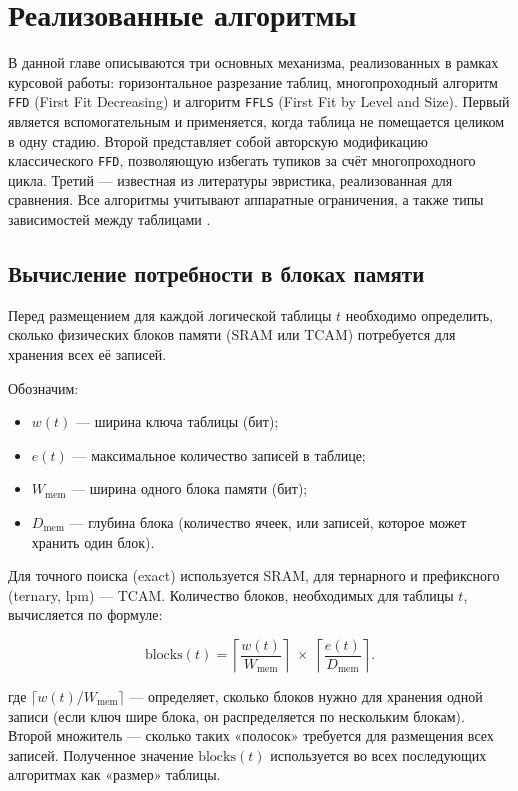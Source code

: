 \section{Реализованные алгоритмы}
\label{sec:Chapter4} 
 

В данной главе описываются три основных механизма, реализованных в рамках курсовой работы: 
горизонтальное разрезание таблиц, многопроходный алгоритм \texttt{FFD} (First Fit Decreasing) и алгоритм 
\texttt{FFLS} (First Fit by Level and Size).  
Первый является вспомогательным и применяется, когда таблица не помещается целиком в одну стадию. 
Второй представляет собой авторскую модификацию классического \texttt{FFD}, позволяющую избегать тупиков 
за счёт многопроходного цикла. Третий — известная из литературы эвристика, 
реализованная для сравнения. Все алгоритмы учитывают аппаратные ограничения, а также типы зависимостей между таблицами .

\subsection{Вычисление потребности в блоках памяти}

Перед размещением для каждой логической таблицы $t$ необходимо определить, сколько физических блоков 
памяти (SRAM или TCAM) потребуется для хранения всех её записей.

Обозначим:
\begin{itemize}
	\item $w(t)$ — ширина ключа таблицы (бит);
	\item $e(t)$ — максимальное количество записей в таблице;
	\item $W_{\text{mem}}$ — ширина одного блока памяти (бит);
	\item $D_{\text{mem}}$ — глубина блока (количество ячеек, или записей, которое может хранить один блок).
\end{itemize}

Для точного поиска (exact) используется SRAM, для тернарного и префиксного (ternary, lpm) — TCAM.  
Количество блоков, необходимых для таблицы $t$, вычисляется по формуле:

\[
\text{blocks}(t) = \left\lceil \frac{w(t)}{W_{\text{mem}}} \right\rceil \;\times\; \left\lceil \frac{e(t)}{D_{\text{mem}}} \right\rceil.
\]

 где $\lceil w(t) / W_{\text{mem}} \rceil$ —  определяет, сколько блоков нужно для хранения одной записи (если ключ шире блока, он распределяется по нескольким блокам). Второй множитель — сколько таких «полосок» требуется для размещения всех записей. Полученное значение $\text{blocks}(t)$ используется во всех последующих алгоритмах как «размер» таблицы.

